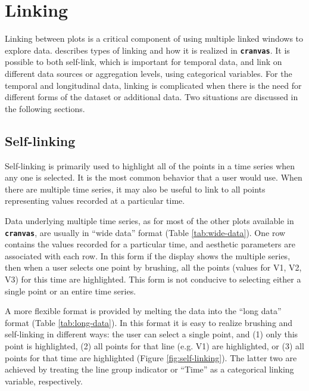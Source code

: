 \documentclass[12pt]{article}
\begin{document}
\section{Linking\label{sec:Linking}}

Linking between plots is a critical component of using multiple linked
windows \citep{stuetzle1987plot} to explore data. \citet{xie2014reactive} describes
types of linking and how it is realized in \texttt{\textbf{cranvas}}.
It is possible to both self-link, which is important for temporal data,
and link on different data sources or aggregation levels, using
categorical variables. For the temporal and longitudinal data,
linking is complicated when there is the need for different forms of
the dataset or additional data. Two situations are discussed in
the following sections.

\subsection{Self-linking}

Self-linking is primarily used to highlight all of the points in a time series when any one is selected. It is the most common behavior that a user would use. When there are multiple time series, it may also be useful to link to all points representing values recorded at a particular time. 

Data underlying multiple time series, as for most of the other
plots available in \texttt{\textbf{cranvas}}, are usually in
``wide data'' format (Table \ref{tab:wide-data}). One row contains
the values recorded for a particular time, and aesthetic
parameters are associated with each row. In this form if the
display shows the multiple series, then when a user selects
one point by brushing, all the points (values for V1, V2, V3)
for this time are highlighted. This form is not conducive to
selecting either a single point or an entire time series. 


A more flexible format is provided by melting the data
into the ``long data'' format (Table \ref{tab:long-data}).
In this format it is easy to realize brushing and self-linking
in different ways: the user can select a single point, and
(1) only this point is highlighted, (2) all points for
that line (e.g. V1) are highlighted, or (3) all points
for that time are highlighted (Figure \ref{fig:self-linking}).
The latter two are achieved by treating the line group
indicator or ``Time'' as a categorical linking variable,
respectively.
\end{document}
